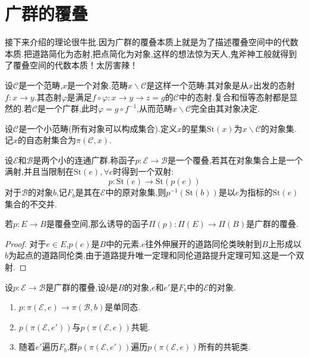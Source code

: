 \section{广群的覆叠}
接下来介绍的理论很牛批.因为广群的覆叠本质上就是为了描述覆叠空间中的代数本质.把道路简化为态射,把点简化为对象,这样的想法惊为天人,鬼斧神工般就得到了覆叠空间的代数本质！太厉害辣！
\begin{definition}
设$\mathcal{C}$是一个范畴,$x$是一个对象.范畴$x\backslash \mathcal{C}$是这样一个范畴:其对象是从$x$出发的态射$f:x \to y$.其态射$\varphi$是满足$f\circ \varphi:x \to y \to z=g$的$\mathcal{C}$中的态射.复合和恒等态射都是显然的.若$\mathcal{C}$是一个广群,此时$\varphi=g\circ f^{-1}$,从而范畴$x\backslash \mathcal{C}$完全由其对象决定.

设$\mathcal{C}$是一个小范畴(所有对象可以构成集合).定义$x$的星集$\mathrm{St}(x)$为$x\backslash \mathcal{C}$的对象集.记$x$的自态射集合为$\pi(\mathcal{C},x)$.
\end{definition}
\begin{definition}[广群的覆叠]
    设$\mathcal{E}$和$\mathcal{B}$是两个小的连通广群.称函子$p:\mathcal{E}\to \mathcal{B}$是一个覆叠,若其在对象集合上是一个满射,并且当限制在$\mathrm{St}(e),\forall e$时得到一个双射:
    $$
    p:\mathrm{St}(e)\to \mathrm{St}(p(e))
    $$
    对于$\mathcal{B}$的对象$b$,记$F_b$是其在$\mathcal{E}$中的原对象集,则$p^{-1}(\mathrm{St}(b))$是以$e$为指标的$\mathrm{St}(e)$集合的不交并.
\end{definition}
\begin{proposition}
    若$p:E \to B$是覆叠空间,那么诱导的函子$\Pi(p):\Pi(E)\to \Pi(B)$是广群的覆叠.
\end{proposition}
\begin{proof}
    对于$e \in E$,$p(e)$是$B$中的元素.$e$往外伸展开的道路同伦类映射到$B$上形成以$b$为起点的道路同伦类.由于道路提升唯一定理和同伦道路提升定理可知,这是一个双射.
\end{proof}
\begin{proposition}
    设$p:\mathcal{E}\to \mathcal{B}$是广群的覆叠,设$b$是$B$的对象,$e$和$e'$是$F_b$中的$\mathcal{E}$的对象.
    \begin{enumerate}
        \item $p:\pi(\mathcal{E},e) \to \pi(\mathcal{B},b)$是单同态.
        \item $p(\pi(\mathcal{E},e'))$与$p(\pi(\mathcal{E},e))$共轭.
        \item 随着$e'$遍历$F_b$,群$p(\pi(\mathcal{E},e'))$遍历$p(\pi(\mathcal{E},e))$所有的共轭类.
    \end{enumerate}
\end{proposition}
